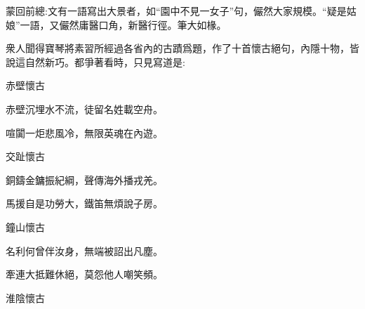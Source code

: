 

\begin{parag}
    \begin{note}蒙回前總:文有一語寫出大景者，如“園中不見一女子”句，儼然大家規模。“疑是姑娘”一語，又儼然庸醫口角，新醫行徑。筆大如椽。\end{note}
\end{parag}


\begin{parag}
    衆人聞得寶琴將素習所經過各省內的古蹟爲題，作了十首懷古絕句，內隱十物，皆說這自然新巧。都爭著看時，只見寫道是:
\end{parag}


\begin{poem}
    \begin{pl}赤壁懷古　\end{pl}

    \begin{pl}赤壁沉埋水不流，徒留名姓載空舟。\end{pl}

    \begin{pl}喧闐一炬悲風冷，無限英魂在內遊。\end{pl}

    \emptypl

    \begin{pl}交趾懷古　\end{pl}

    \begin{pl}銅鑄金鏞振紀綱，聲傳海外播戎羌。\end{pl}

    \begin{pl}馬援自是功勞大，鐵笛無煩說子房。\end{pl}

    \emptypl

    \begin{pl}鐘山懷古　\end{pl}

    \begin{pl}名利何曾伴汝身，無端被詔出凡塵。\end{pl}

    \begin{pl}牽連大抵難休絕，莫怨他人嘲笑頻。\end{pl}

    \emptypl
    \begin{pl}淮陰懷古　\end{pl}


\end{poem}
